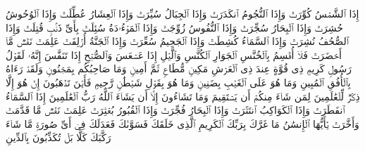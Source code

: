 \startbuffer[\q:81:1]
إِذَا ٱلشَّمۡسُ كُوِّرَتۡ%
\stopbuffer
\startbuffer[\q:81:2]
وَإِذَا ٱلنُّجُومُ ٱنكَدَرَتۡ%
\stopbuffer
\startbuffer[\q:81:3]
وَإِذَا ٱلۡجِبَالُ سُیِّرَتۡ%
\stopbuffer
\startbuffer[\q:81:4]
وَإِذَا ٱلۡعِشَارُ عُطِّلَتۡ%
\stopbuffer
\startbuffer[\q:81:5]
وَإِذَا ٱلۡوُحُوشُ حُشِرَتۡ%
\stopbuffer
\startbuffer[\q:81:6]
وَإِذَا ٱلۡبِحَارُ سُجِّرَتۡ%
\stopbuffer
\startbuffer[\q:81:7]
وَإِذَا ٱلنُّفُوسُ زُوِّجَتۡ%
\stopbuffer
\startbuffer[\q:81:8]
وَإِذَا ٱلۡمَوۡءُۥدَةُ سُئِلَتۡ%
\stopbuffer
\startbuffer[\q:81:9]
بِأَیِّ ذَنۢبࣲ قُتِلَتۡ%
\stopbuffer
\startbuffer[\q:81:10]
وَإِذَا ٱلصُّحُفُ نُشِرَتۡ%
\stopbuffer
\startbuffer[\q:81:11]
وَإِذَا ٱلسَّمَاۤءُ كُشِطَتۡ%
\stopbuffer
\startbuffer[\q:81:12]
وَإِذَا ٱلۡجَحِیمُ سُعِّرَتۡ%
\stopbuffer
\startbuffer[\q:81:13]
وَإِذَا ٱلۡجَنَّةُ أُزۡلِفَتۡ%
\stopbuffer
\startbuffer[\q:81:14]
عَلِمَتۡ نَفۡسࣱ مَّاۤ أَحۡضَرَتۡ%
\stopbuffer
\startbuffer[\q:81:15]
فَلَاۤ أُقۡسِمُ بِٱلۡخُنَّسِ%
\stopbuffer
\startbuffer[\q:81:16]
ٱلۡجَوَارِ ٱلۡكُنَّسِ%
\stopbuffer
\startbuffer[\q:81:17]
وَٱلَّیۡلِ إِذَا عَسۡعَسَ%
\stopbuffer
\startbuffer[\q:81:18]
وَٱلصُّبۡحِ إِذَا تَنَفَّسَ%
\stopbuffer
\startbuffer[\q:81:19]
إِنَّهُۥ لَقَوۡلُ رَسُولࣲ كَرِیمࣲ%
\stopbuffer
\startbuffer[\q:81:20]
ذِی قُوَّةٍ عِندَ ذِی ٱلۡعَرۡشِ مَكِینࣲ%
\stopbuffer
\startbuffer[\q:81:21]
مُّطَاعࣲ ثَمَّ أَمِینࣲ%
\stopbuffer
\startbuffer[\q:81:22]
وَمَا صَاحِبُكُم بِمَجۡنُونࣲ%
\stopbuffer
\startbuffer[\q:81:23]
وَلَقَدۡ رَءَاهُ بِٱلۡأُفُقِ ٱلۡمُبِینِ%
\stopbuffer
\startbuffer[\q:81:24]
وَمَا هُوَ عَلَى ٱلۡغَیۡبِ بِضَنِینࣲ%
\stopbuffer
\startbuffer[\q:81:25]
وَمَا هُوَ بِقَوۡلِ شَیۡطَٰنࣲ رَّجِیمࣲ%
\stopbuffer
\startbuffer[\q:81:26]
فَأَیۡنَ تَذۡهَبُونَ%
\stopbuffer
\startbuffer[\q:81:27]
إِنۡ هُوَ إِلَّا ذِكۡرࣱ لِّلۡعَٰلَمِینَ%
\stopbuffer
\startbuffer[\q:81:28]
لِمَن شَاۤءَ مِنكُمۡ أَن یَسۡتَقِیمَ%
\stopbuffer
\startbuffer[\q:81:29]
وَمَا تَشَاۤءُونَ إِلَّاۤ أَن یَشَاۤءَ ٱللَّهُ رَبُّ ٱلۡعَٰلَمِینَ%
\stopbuffer
\startbuffer[\q:82:1]
إِذَا ٱلسَّمَاۤءُ ٱنفَطَرَتۡ%
\stopbuffer
\startbuffer[\q:82:2]
وَإِذَا ٱلۡكَوَاكِبُ ٱنتَثَرَتۡ%
\stopbuffer
\startbuffer[\q:82:3]
وَإِذَا ٱلۡبِحَارُ فُجِّرَتۡ%
\stopbuffer
\startbuffer[\q:82:4]
وَإِذَا ٱلۡقُبُورُ بُعۡثِرَتۡ%
\stopbuffer
\startbuffer[\q:82:5]
عَلِمَتۡ نَفۡسࣱ مَّا قَدَّمَتۡ وَأَخَّرَتۡ%
\stopbuffer
\startbuffer[\q:82:6]
یَٰۤأَیُّهَا ٱلۡإِنسَٰنُ مَا غَرَّكَ بِرَبِّكَ ٱلۡكَرِیمِ%
\stopbuffer
\startbuffer[\q:82:7]
ٱلَّذِی خَلَقَكَ فَسَوَّىٰكَ فَعَدَلَكَ%
\stopbuffer
\startbuffer[\q:82:8]
فِیۤ أَیِّ صُورَةࣲ مَّا شَاۤءَ رَكَّبَكَ%
\stopbuffer
\startbuffer[\q:82:9]
كَلَّا بَلۡ تُكَذِّبُونَ بِٱلدِّینِ%
\stopbuffer
